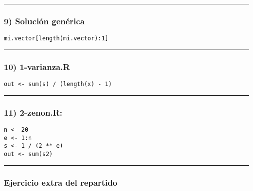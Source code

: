 \documentclass[]{article}
\begin{document}
\begin{center}\rule{3in}{0.4pt}\end{center}

\subsubsection{9) Solución genérica}

\begin{verbatim}
mi.vector[length(mi.vector):1]
\end{verbatim}
\begin{center}\rule{3in}{0.4pt}\end{center}

\subsubsection{10) 1-varianza.R}

\begin{verbatim}
out <- sum(s) / (length(x) - 1)
\end{verbatim}
\begin{center}\rule{3in}{0.4pt}\end{center}

\subsubsection{11) 2-zenon.R:}

\begin{verbatim}
n <- 20
e <- 1:n
s <- 1 / (2 ** e)
out <- sum(s2)
\end{verbatim}
\begin{center}\rule{3in}{0.4pt}\end{center}

\subsubsection{Ejercicio extra del repartido}
\end{document}

